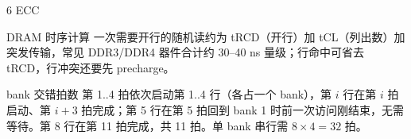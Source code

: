 \begin{chapteranswer}{6}
ECC
\end{chapteranswer}

\begin{chapteranswer}{DRAM 时序计算}
一次需要开行的随机读约为 tRCD（开行）加 tCL（列出数）加突发传输，常见 DDR3/DDR4 器件合计约 30--40 ns 量级；行命中可省去 tRCD，行冲突还要先 precharge。
\end{chapteranswer}

\begin{chapteranswer}{bank 交错拍数}
第 1..4 拍依次启动第 1..4 行（各占一个 bank），第 $i$ 行在第 $i$ 拍启动、第 $i+3$ 拍完成；第 5 行在第 5 拍回到 bank 1 时前一次访问刚结束，无需等待。第 8 行在第 11 拍完成，共 11 拍。单 bank 串行需 $8\times4=32$ 拍。
\end{chapteranswer}
